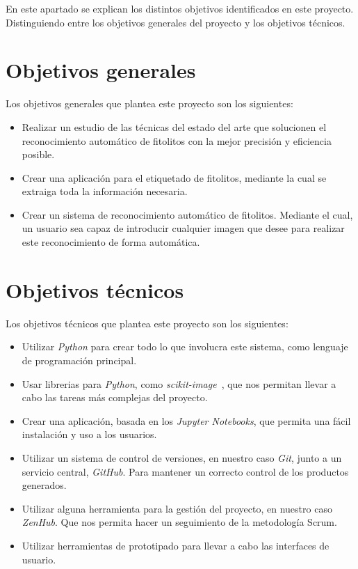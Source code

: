 

En este apartado se explican los distintos objetivos identificados en este proyecto. Distinguiendo entre los objetivos generales del proyecto y los objetivos técnicos.

\section{Objetivos generales}

Los objetivos generales que plantea este proyecto son los siguientes:

\begin{itemize}
	\item Realizar un estudio de las técnicas del estado del arte que solucionen el reconocimiento automático de fitolitos con la mejor precisión y eficiencia posible.
	\item Crear una aplicación para el etiquetado de fitolitos, mediante la cual se extraiga toda la información necesaria.
	\item Crear un sistema de reconocimiento automático de fitolitos. Mediante el cual, un usuario sea capaz de introducir cualquier imagen que desee para realizar este reconocimiento de forma automática.
\end{itemize}

\section{Objetivos técnicos}

Los objetivos técnicos que plantea este proyecto son los siguientes:

\begin{itemize}
	\item Utilizar \textit{Python} para crear todo lo que involucra este sistema, como lenguaje de programación principal.
	\item Usar librerias para \textit{Python}, como \textit{scikit-image}~\cite{scikit-image}, que nos permitan llevar a cabo las tareas más complejas del proyecto.
	\item Crear una aplicación, basada en los \textit{Jupyter Notebooks}, que permita una fácil instalación y uso a los usuarios.
	\item Utilizar un sistema de control de versiones, en nuestro caso \textit{Git}, junto a un servicio central, \textit{GitHub}. Para mantener un correcto control de los productos generados.
	\item Utilizar alguna herramienta para la gestión del proyecto, en nuestro caso \textit{ZenHub}. Que nos permita hacer un seguimiento de la metodología Scrum.
	\item Utilizar herramientas de prototipado para llevar a cabo las interfaces de usuario.
\end{itemize}
